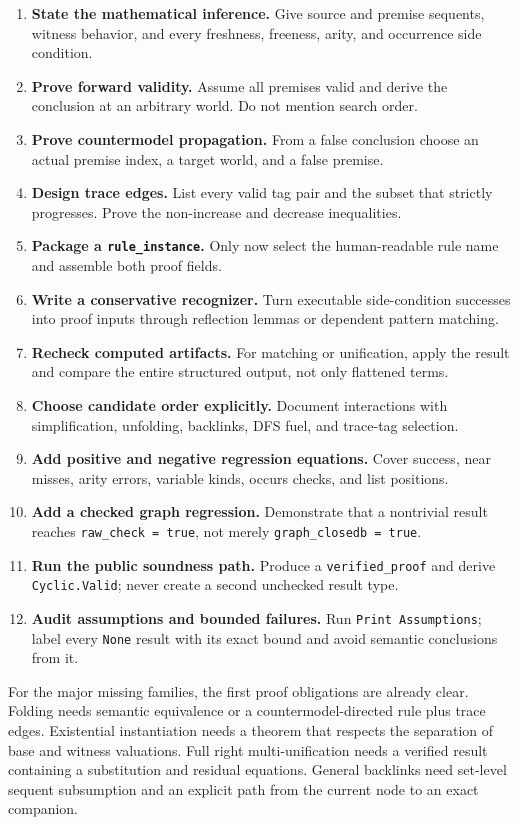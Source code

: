 \documentclass[11pt,oneside]{book}
\DeclareRobustCommand{\code}[1]{\nolinkurl{#1}}
\begin{document}
\begin{enumerate}[leftmargin=*]
\item \textbf{State the mathematical inference.}  Give source and premise
sequents, witness behavior, and every freshness, freeness, arity, and
occurrence side condition.
\item \textbf{Prove forward validity.}  Assume all premises valid and derive
the conclusion at an arbitrary world.  Do not mention search order.
\item \textbf{Prove countermodel propagation.}  From a false conclusion choose
an actual premise index, a target world, and a false premise.
\item \textbf{Design trace edges.}  List every valid tag pair and the subset
that strictly progresses.  Prove the non-increase and decrease inequalities.
\item \textbf{Package a \code{rule_instance}.}  Only now select the human-readable
rule name and assemble both proof fields.
\item \textbf{Write a conservative recognizer.}  Turn executable side-condition
successes into proof inputs through reflection lemmas or dependent pattern
matching.
\item \textbf{Recheck computed artifacts.}  For matching or unification, apply
the result and compare the entire structured output, not only flattened terms.
\item \textbf{Choose candidate order explicitly.}  Document interactions with
simplification, unfolding, backlinks, DFS fuel, and trace-tag selection.
\item \textbf{Add positive and negative regression equations.}  Cover success,
near misses, arity errors, variable kinds, occurs checks, and list positions.
\item \textbf{Add a checked graph regression.}  Demonstrate that a nontrivial
result reaches \code{raw_check = true}, not merely \code{graph_closedb = true}.
\item \textbf{Run the public soundness path.}  Produce a \code{verified_proof}
and derive \code{Cyclic.Valid}; never create a second unchecked result type.
\item \textbf{Audit assumptions and bounded failures.}  Run
\code{Print Assumptions}; label every \code{None} result with its exact bound
and avoid semantic conclusions from it.
\end{enumerate}

For the major missing families, the first proof obligations are already clear.
Folding needs semantic equivalence or a countermodel-directed rule plus trace
edges.  Existential instantiation needs a theorem that respects the separation
of base and witness valuations.  Full right multi-unification needs a verified
result containing a substitution and residual equations.  General backlinks
need set-level sequent subsumption and an explicit path from the current node
to an exact companion.
\end{document}
